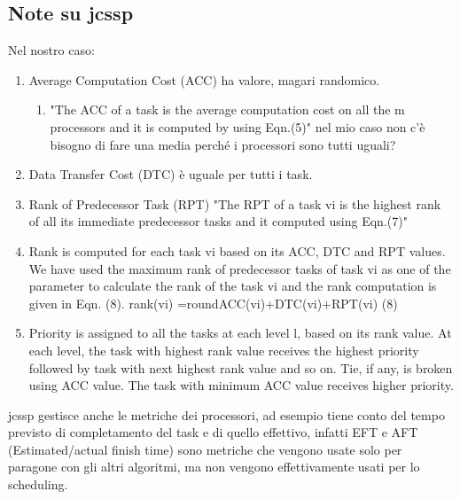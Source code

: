 \documentclass{article}
\begin{document}
        \subsection{Note su jcssp}
        Nel nostro caso:
        \begin{enumerate}
            \item Average  Computation  Cost  (ACC) ha valore, magari randomico.
            \begin{enumerate}
                \item "The   ACC   of   a   task   is   the   average   computation  cost  on  all  the  m  processors  and  it  is  computed by using Eqn.(5)" nel mio caso non c'è bisogno di fare una media perché i processori sono tutti uguali?
            \end{enumerate}
            \item Data Transfer Cost (DTC) è uguale per tutti i task.
            \item Rank of Predecessor Task   (RPT) "The  RPT  of  a  task  vi  is  the  highest  rank  of  all  its  immediate  predecessor  tasks  and  it  computed  using  Eqn.(7)"
            \item Rank  is  computed  for  each  task  vi  based  on  its  ACC,   DTC   and   RPT   values.   We   have   used   the   maximum rank of predecessor tasks of task vi as one of the parameter to calculate the rank of the task vi and the rank computation is given in Eqn. (8).  rank(vi) =round{ACC(vi)+DTC(vi)+RPT(vi) } (8)
            \item Priority  is  assigned  to  all  the  tasks  at  each  level  l, based  on  its  rank  value.  At  each  level,  the  task  with  highest    rank    value    receives    the    highest    priority    followed  by  task  with  next  highest  rank  value  and  so  on.  Tie,  if  any,  is  broken  using  ACC  value.  The  task  with  minimum  ACC value receives higher priority.
        \end{enumerate}

        jcssp gestisce anche le metriche dei processori, ad esempio tiene conto del tempo previsto di completamento del task e di quello effettivo, infatti EFT e AFT (Estimated/actual finish time) sono metriche che vengono usate solo per paragone con gli altri algoritmi, ma non vengono effettivamente usati per lo scheduling.
\end{document}

